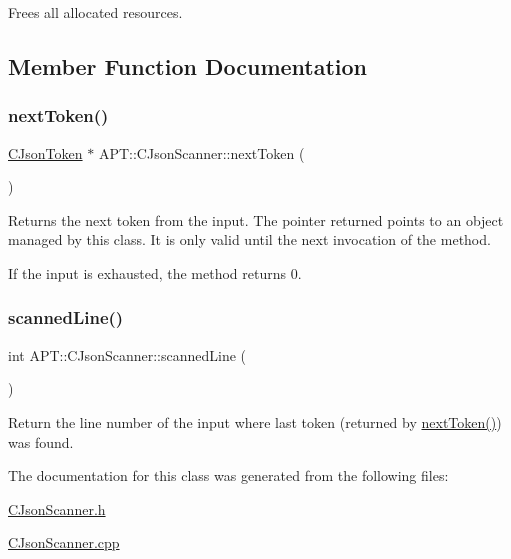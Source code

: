 Frees all allocated resources. 

\subsection{Member Function Documentation}
\mbox{\label{classAPT_1_1CJsonScanner_afe3b93ec865d0a77c31df6966e6fc4e1}} 
\subsubsection{\texorpdfstring{next\+Token()}{nextToken()}}
{\footnotesize\ttfamily \hyperlink{classAPT_1_1CJsonToken}{C\+Json\+Token} $\ast$ A\+P\+T\+::\+C\+Json\+Scanner\+::next\+Token (\begin{DoxyParamCaption}{ }\end{DoxyParamCaption})}

Returns the next token from the input. The pointer returned points to an object managed by this class. It is only valid until the next invocation of the method.

If the input is exhausted, the method returns 0. \mbox{\label{classAPT_1_1CJsonScanner_adf983e640d42df3a5796b9f2aa2df5c0}} 
\subsubsection{\texorpdfstring{scanned\+Line()}{scannedLine()}}
{\footnotesize\ttfamily int A\+P\+T\+::\+C\+Json\+Scanner\+::scanned\+Line (\begin{DoxyParamCaption}{ }\end{DoxyParamCaption})}

Return the line number of the input where last token (returned by \hyperlink{classAPT_1_1CJsonScanner_afe3b93ec865d0a77c31df6966e6fc4e1}{next\+Token()}) was found. 

The documentation for this class was generated from the following files\+:\begin{DoxyCompactItemize}
\item 
\hyperlink{CJsonScanner_8h}{C\+Json\+Scanner.\+h}\item 
\hyperlink{CJsonScanner_8cpp}{C\+Json\+Scanner.\+cpp}\end{DoxyCompactItemize}
